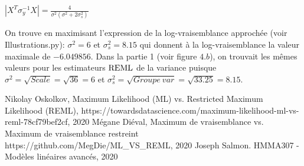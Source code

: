 \vspace{2mm}

$
|X^T\sigma_y^{-1}X|=\frac{4}{\sigma^2(\sigma^2+2\sigma_s^2)}
$

\vspace{4mm}

On trouve en maximisant l'expression de la log-vraisemblance approchée (voir Illustrations.py): $\sigma^2=6$ et $\sigma^2_s=8.15$ qui donnent à la log-vraisemblance la valeur maximale de $-6.049856$. Dans la partie 1 (voir figure $4.b$), on trouvait les mêmes valeurs pour les estimateurs $\rm{REML}$ de la variance puisque $\sigma^2=\sqrt{Scale}=\sqrt{36}=6$ et $\sigma^2_s=\sqrt{Groupe \ var}=\sqrt{33.25}=8.15$.

\begin{thebibliography}{}
\bibitem{}Nikolay Oskolkov, Maximum Likelihood (ML) vs. Restricted Maximum Likelihood (REML), https://towardsdatascience.com/maximum-likelihood-ml-vs-reml-78cf79bef2cf, 2020
\bibitem{}Mégane Diéval, Maximum de vraisemblance vs. Maximum de vraisemblance restreint https://github.com/MegDie/ML\_VS\_REML, 2020
\bibitem{}Joseph Salmon. HMMA307 - Modèles linéaires avancés, 2020

\end{thebibliography}

















